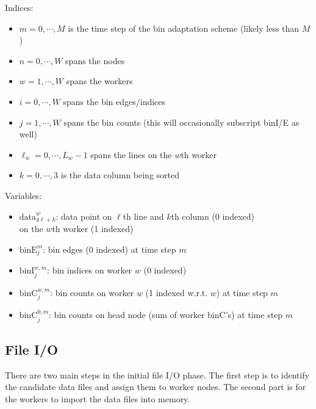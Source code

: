 \documentclass{article}
\begin{document}
\begin{mdframed}[backgroundcolor=blue!20]
	Indices:
	\setlength\itemsep{0.1pt}
	\setlength\parskip{0.1pt}
	\begin{itemize}
		\setlength\itemsep{0.1pt}
		\setlength\parskip{0.1pt}
		\item $m = 0, \cdots, M$ is the time step of the bin adaptation scheme (likely less than $M$)
		\item $n = 0, \cdots, W$ spans the nodes
		\item $w = 1, \cdots, W$ spans the workers
		\item $i = 0, \cdots, W$ spans the bin edges/indices
		\item $j = 1, \cdots, W$ spans the bin counts (this will occasionally subscript binI/E as well)
		\item $\ell_w = 0, \cdots, L_w-1$ spans the lines on the $w$th worker
		\item $k = 0, \cdots, 3$ is the data column being sorted
	\end{itemize}
\end{mdframed}

\begin{mdframed}[backgroundcolor=blue!20]
	Variables:
	\setlength\itemsep{0.1pt}
	\setlength\parskip{0.1pt}
	\begin{itemize}
		\setlength\itemsep{0.1pt}
		\setlength\parskip{0.1pt}
		\item $\textrm{data}^w_{4\ell+k}$: data point on $\ell$th line and $k$th column (0 indexed)\\ on the $w$th worker (1 indexed)
		\item $\textrm{binE}^m_j$: bin edges (0 indexed) at time step $m$
		\item $\textrm{binI}^{w,m}_j$: bin indices on worker $w$ (0 indexed)
		\item $\textrm{binC}^{w,m}_j$: bin counts on worker $w$ (1 indexed w.r.t. $w$) at time step $m$
		\item $\textrm{binC}^{0,m}_j$: bin counts on head node (sum of worker binC's) at time step $m$
	\end{itemize}
\end{mdframed}


\subsection{File I/O}
% 
There are two main steps in the initial file I/O phase. The first step is to identify the candidate data files and assign them to worker nodes. The second part is for the workers to import the data files into memory.
\end{document}
